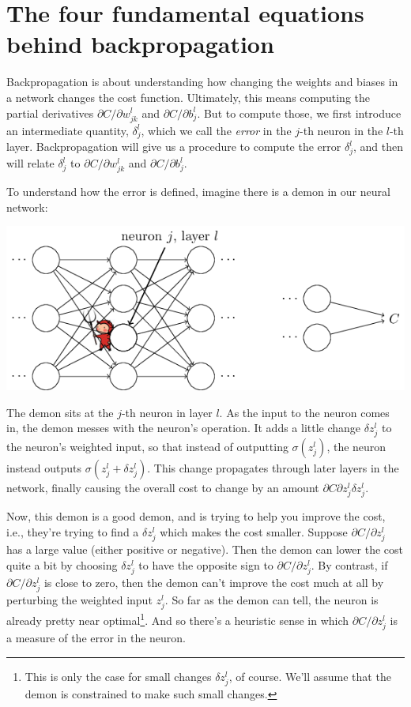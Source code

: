 \documentclass[a4paper,twoside,10pt]{book}
\begin{document}
\section{The four fundamental equations behind backpropagation}
\label{sec:2.4}
Backpropagation is about understanding how changing the weights and biases in a network changes the cost function. Ultimately, this means computing the partial derivatives $\partial{}C/\partial{}w^l_{jk}$ and $\partial{}C/\partial{}b^l_j$. But to compute those, we first introduce an intermediate quantity, $\delta^l_j$, which we call the \textit{error} in the $j$-th neuron in the $l$-th layer. Backpropagation will give us a procedure to compute the error $\delta^l_j$, and then will relate $\delta^l_j$ to $\partial{}C/\partial{}w^l_{jk}$ and $\partial{}C/\partial{}b^l_j$.

To understand how the error is defined, imagine there is a demon in our neural network:

\begin{center}
	\includegraphics[width=0.5\linewidth]{./figures/ch2/tikz19}
\end{center}
The demon sits at the $j$-th neuron in layer $l$. As the input to the neuron comes in, the demon messes with the neuron's operation. It adds a little change $\delta{}z^l_j$ to the neuron's weighted input, so that instead of outputting $\sigma(z^l_j)$, the neuron instead outputs $\sigma(z^l_j+\delta{}z^l_j)$. This change propagates through later layers in the network, finally causing the overall cost to change by an amount $\partial{}C\partial{}z^l_j\delta{}z^l_j$.

Now, this demon is a good demon, and is trying to help you improve the cost, i.e., they're trying to find a $\delta{}z^l_j$ which makes the cost smaller. Suppose $\partial{}C/\partial{}z^l_j$ has a large value (either positive or negative). Then the demon can lower the cost quite a bit by choosing $\delta{}z^l_j$ to have the opposite sign to $\partial{}C/\partial{}z^l_j$. By contrast, if $\partial{}C/\partial{}z^l_j$ is close to zero, then the demon can't improve the cost much at all by perturbing the weighted input $z^l_j$. So far as the demon can tell, the neuron is already pretty near optimal\footnote{This is only the case for small changes $\delta{}z^l_j$, of course. We'll assume that the demon is constrained to make such small changes.}. And so there's a heuristic sense in which $\partial{}C/\partial{}z^l_j$ is a measure of the error in the neuron.
\end{document}
